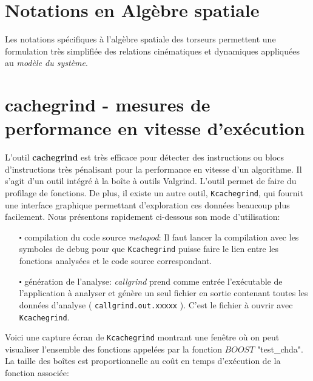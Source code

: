 
\chapter{Notations en Algèbre spatiale} \label{appx_notations}

Les notations spécifiques à l'algèbre spatiale des torseurs permettent une formulation très simplifiée des relations cinématiques et dynamiques appliquées au \emph{modèle du système}.\\

\chapter{cachegrind - mesures de performance en vitesse d'exécution} \label{appx_cachegrind}

L'outil \textbf{cachegrind} est très efficace pour détecter des instructions ou blocs d'instructions très pénalisant pour la performance en vitesse d'un algorithme. Il s'agit d'un outil intégré à la boîte à outils Valgrind. L'outil permet de faire du profilage de fonctions. De plus, il existe un autre outil, \verb;Kcachegrind;, qui fournit une interface graphique permettant d'exploration ces données beaucoup plus facilement. Nous présentons rapidement ci-dessous son mode d'utilisation:
\begin{itemize}
\item[$\centerdot$ compilation du code source \emph{metapod}:] Il faut lancer la compilation avec les symboles de debug pour que \verb;Kcachegrind; puisse faire le lien entre les fonctions analysées et le code source correspondant.
\item[$\centerdot$ génération de l'analyse:]  \emph{callgrind} prend comme entrée l'exécutable de l'application à analyser et génère un seul fichier en sortie contenant toutes les données d'analyse ( \verb;callgrind.out.xxxxx; ). C'est le fichier à ouvrir avec \verb;Kcachegrind;.
\end{itemize}

Voici une capture écran de \verb;Kcachegrind; montrant une fenêtre où on peut visualiser l'ensemble des fonctions appelées par la fonction $BOOST$ "test\_chda". La taille des boîtes est proportionnelle au coût en temps d'exécution de la fonction associée:

